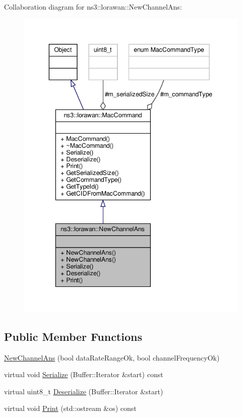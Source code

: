 Collaboration diagram for ns3\+:\+:lorawan\+:\+:New\+Channel\+Ans\+:
\nopagebreak
\begin{figure}[H]
\begin{center}
\leavevmode
\includegraphics[width=343pt]{classns3_1_1lorawan_1_1NewChannelAns__coll__graph}
\end{center}
\end{figure}
\subsection*{Public Member Functions}
\begin{DoxyCompactItemize}
\item 
\hyperlink{classns3_1_1lorawan_1_1NewChannelAns_adb8afb397b3b9db5713a12e037197136}{New\+Channel\+Ans} (bool data\+Rate\+Range\+Ok, bool channel\+Frequency\+Ok)
\item 
virtual void \hyperlink{classns3_1_1lorawan_1_1NewChannelAns_a399acb39006cf6d23e19b359385c48b0}{Serialize} (Buffer\+::\+Iterator \&start) const
\item 
virtual uint8\+\_\+t \hyperlink{classns3_1_1lorawan_1_1NewChannelAns_ae77b621e4111235558df52fd6cbff0aa}{Deserialize} (Buffer\+::\+Iterator \&start)
\item 
virtual void \hyperlink{classns3_1_1lorawan_1_1NewChannelAns_ad0528161cddbea57fc0b509b3b76c9b7}{Print} (std\+::ostream \&os) const
\end{DoxyCompactItemize}
